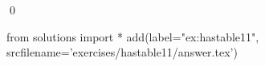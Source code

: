 
\begin{ex} 
  \label{ex:hastable11}
  
  \qed
\end{ex} 
\begin{python0}
from solutions import *
add(label="ex:hastable11",
    srcfilename='exercises/hastable11/answer.tex') 
\end{python0}
